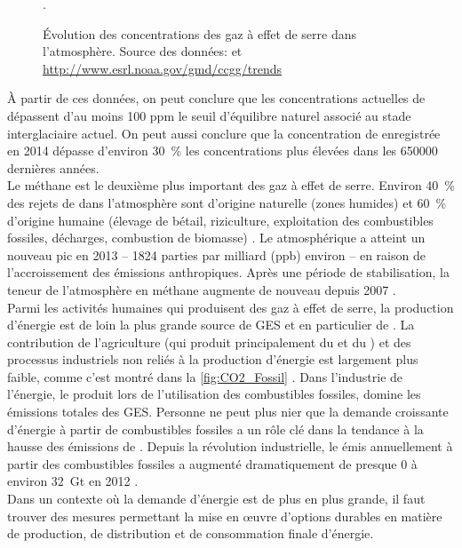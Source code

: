 \begin{figure}[ht]
        \caption{Évolution des concentrations des gaz à effet de serre dans
l'atmosphère. Source des données: \citet{Epica,Siple,Vostok,WMO14} et
\url{http://www.esrl.noaa.gov/gmd/ccgg/trends}}\label{fig:GES_tot}.
\end{figure}
À partir de ces données, on peut conclure que les concentrations actuelles de
 dépassent d’au moins 100 ppm le seuil d'équilibre naturel associé au
stade interglaciaire actuel. On peut aussi conclure que la concentration de
 enregistrée en \num{2014} dépasse d'environ \SI{30}{\percent} les
concentrations plus élevées dans les \num{650000} dernières années. \\
Le méthane  est le deuxième plus important des gaz à effet de serre. Environ
\SI{40}{\percent} des rejets de  dans l'atmosphère sont d'origine
naturelle (zones humides) et \SI{60}{\percent} d'origine humaine (élevage de
bétail, riziculture, exploitation des combustibles fossiles, décharges,
combustion de biomasse) \citep{WMO2014}. Le  atmosphérique a atteint un
nouveau pic en \num{2013} – \num{1824} parties par milliard (ppb) environ – en
raison de l'accroissement des émissions anthropiques. Après une période de
stabilisation, la teneur de l'atmosphère en méthane augmente de nouveau depuis
\num{2007} \citep{WMO2014}.\\
Parmi les activités humaines qui produisent des gaz à effet de serre, la
production d’énergie est de loin la plus grande source de GES et en particulier
de . La contribution de l'agriculture (qui produit principalement du
 et du ) et des processus industriels non reliés à la production
d'énergie est largement plus faible, comme c'est montré dans la
\cref{fig:CO2_Fossil} \citep{IEA_fossil}.
Dans l'industrie de l'énergie, le  produit lors de l'utilisation des
combustibles fossiles, domine les émissions totales des GES. Personne ne peut plus nier
que la demande croissante d'énergie à partir de combustibles fossiles a un rôle
clé dans la tendance à la hausse des émissions de . Depuis la révolution
industrielle, le  émis annuellement à partir des combustibles fossiles
a augmenté dramatiquement de presque \num{0} à environ \SI{32}{\giga\tonne}
 en \num{2012} \citep{IEA_fossil}.\\
Dans un contexte où la demande d’énergie est de plus en plus grande, il faut
trouver des mesures permettant la mise en œuvre d'options durables en matière
de production, de distribution et de consommation finale d'énergie.
